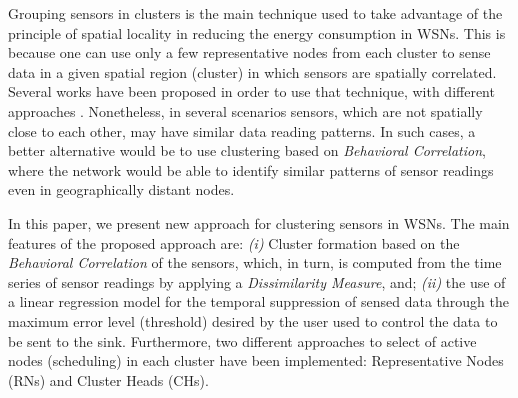 \documentclass[conference]{IEEEtran}
\begin{document}

Grouping sensors in clusters is the main technique used to take advantage of the
principle of spatial locality in reducing the energy consumption in WSNs. This
is because one can use only a few representative nodes from each cluster to
sense data in a given spatial region (cluster) in which sensors are spatially
correlated.
Several works have been proposed in order to use that technique, with different
approaches \cite{Chu2006, Villas2012, Singh2010, Liu2007, Shah2007}.
Nonetheless, in several scenarios sensors, which are not spatially close to each
other, may have similar data reading patterns. In such cases, a better
alternative would be to use clustering based on \textit{Behavioral Correlation},
where the network would be able to identify similar patterns of sensor readings
even in geographically distant nodes.

In this paper, we present new approach for clustering sensors in WSNs. The main
features of the proposed approach are: {\it (i)} Cluster formation based on the
\textit{Behavioral Correlation} of the sensors, which, in turn, is computed 
from the time series of sensor readings by applying a \textit{Dissimilarity
Measure}, and; {\it (ii)} the use of a linear regression model for the temporal
suppression of sensed data through the maximum error level (threshold) desired
by the user used to control the data to be sent to the sink. Furthermore, two
different approaches to select of active nodes (scheduling) in each cluster have
been implemented: Representative Nodes (RNs) and Cluster Heads (CHs).
\end{document}
